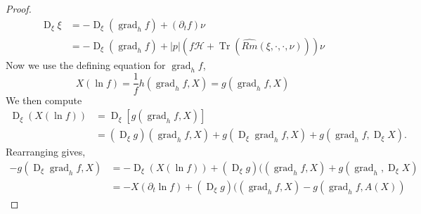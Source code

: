 \documentclass{amsart}
\theoremstyle{definition}
\theoremstyle{remark}
\DeclareMathOperator{\grad}{grad}
\DeclareMathOperator{\Tr}{Tr}
\DeclareMathOperator{\D}{D}
\numberwithin{equation}{section}
\begin{document}
\begin{proof}
\begin{equation}
\label{eq:dt_transverse_productrule}
\begin{split}
\D_{\xi}\xi &= -\D_{\xi} \left(\grad_h f\right) + (\partial_t f) \nu \\
&= -\D_{\xi}\left(\grad_h f\right) + |p|(f\mathcal{H}+\Tr (\widehat{Rm}(\xi,\cdot,\cdot,\nu))) \nu
\end{split}
\end{equation}
Now we use the defining equation for $\grad_h f$,
\[
X(\ln f) = \frac{1}{f} h(\grad_h f, X) = g(\grad_h f, X)
\]
We then compute
\[
\begin{split}
\D_{\xi} \left(X(\ln f)\right) &= \D_{\xi} \left[g(\grad_h f, X)\right] \\
&= (\D_{\xi} g) (\grad_h f, X) + g(\D_{\xi} \grad_h f, X) + g(\grad_h f,  \D_{\xi} X).
\end{split}
\]
Rearranging gives,
\begin{equation}
\label{eq:dt_transversegradient_structure}
\begin{split}
-g(\D_{\xi} \grad_h f, X) &= -\D_{\xi} \left(X(\ln f)\right) + (\D_{\xi} g) ((\grad_h f, X) + g(\grad_h,  \D_{\xi} X) \\
&= -X(\partial_t \ln f) + (\D_{\xi} g) ((\grad_h f, X) - g(\grad_h f,  A(X))
\end{split}
\end{equation}


\end{proof}
\end{document}
